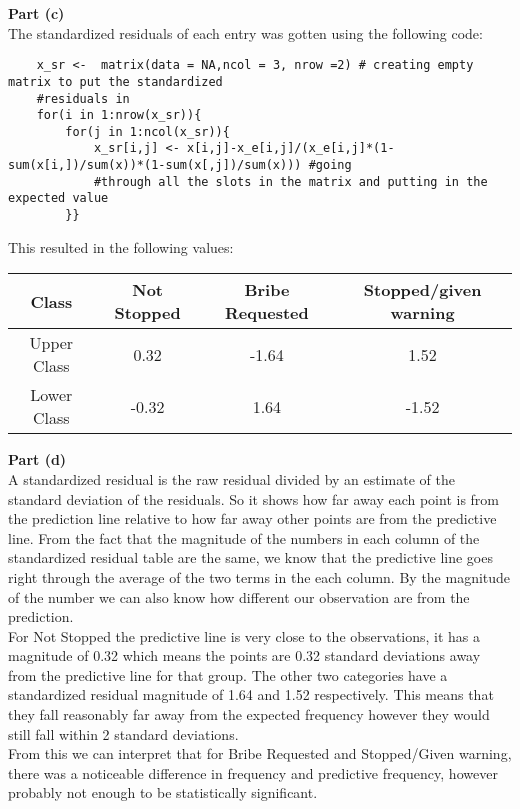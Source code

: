 \documentclass{article}
\begin{document}
\textbf{\large Part (c)\\}
The standardized residuals of each entry was gotten using the following code:
\begin{verbatim}
	x_sr <-  matrix(data = NA,ncol = 3, nrow =2) # creating empty matrix to put the standardized 
	#residuals in
	for(i in 1:nrow(x_sr)){
	    for(j in 1:ncol(x_sr)){
	        x_sr[i,j] <- x[i,j]-x_e[i,j]/(x_e[i,j]*(1-sum(x[i,])/sum(x))*(1-sum(x[,j])/sum(x))) #going 
	        #through all the slots in the matrix and putting in the expected value
	    }}
\end{verbatim}
This resulted in the following values:\\
\begin{table}[h]
	\centering
	\begin{tabular}{c |c c c }
		
		Class & Not Stopped & Bribe Requested & Stopped/given warning \\
		\hline 
		Upper Class & 0.32 & -1.64 & 1.52 \\
		Lower Class & -0.32 & 1.64 & -1.52 \\
		\hline
	
	\end{tabular}
\end{table}
\pagebreak







\textbf{\large Part (d)\\}
 A standardized residual is the raw residual divided by an estimate of the standard deviation of the residuals. So it shows how far away each point is from the prediction line relative to how far away other points are from the predictive line. From the fact that the magnitude of the numbers in each column of the standardized residual table are the same, we know that the predictive line goes right through the average of the two terms in the each column. By the magnitude of the number we can also know how different our observation are from the prediction.\\
   For Not Stopped the predictive line is very close to the observations, it has a magnitude of 0.32 which means the points are 0.32 standard deviations away from the predictive line for that group. The other two categories have a standardized residual magnitude of 1.64 and 1.52 respectively. This means that they fall reasonably far away from the expected frequency however they would still fall within 2 standard deviations.\\
 From this we can interpret that for Bribe Requested and Stopped/Given warning, there was a noticeable difference in frequency and predictive frequency, however probably not enough to be statistically significant.\\
\pagebreak
 
\end{document}

